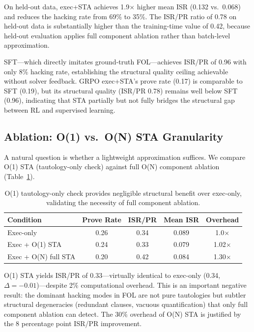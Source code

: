 \documentclass[11pt,a4paper]{article}
\begin{document}
On held-out data, exec+STA achieves 1.9$\times$ higher mean ISR (0.132 vs.\ 0.068) and reduces the hacking rate from 69\% to 35\%.
The ISR/PR ratio of 0.78 on held-out data is substantially higher than the training-time value of 0.42, because held-out evaluation applies full component ablation rather than batch-level approximation.

SFT---which directly imitates ground-truth FOL---achieves ISR/PR of 0.96 with only 8\% hacking rate, establishing the structural quality ceiling achievable without solver feedback.
GRPO exec+STA's prove rate (0.17) is comparable to SFT (0.19), but its structural quality (ISR/PR 0.78) remains well below SFT (0.96), indicating that STA partially but not fully bridges the structural gap between RL and supervised learning.

\subsection{Ablation: O(1) vs.\ O(N) STA Granularity}

A natural question is whether a lightweight approximation suffices.
We compare O(1) STA (tautology-only check) against full O(N) component ablation (Table~\ref{tab:o1_on}).

\begin{table}[t]
\centering
\small
\caption{O(1) tautology-only check provides negligible structural benefit over exec-only, validating the necessity of full component ablation.}
\label{tab:o1_on}
\begin{tabular}{lcccc}
\toprule
Condition & Prove Rate & ISR/PR & Mean ISR & Overhead \\
\midrule
Exec-only           & 0.26 & 0.34 & 0.089 & 1.0$\times$ \\
Exec + O(1) STA     & 0.24 & 0.33 & 0.079 & 1.02$\times$ \\
Exec + O(N) full STA & 0.20 & 0.42 & 0.084 & 1.30$\times$ \\
\bottomrule
\end{tabular}
\end{table}

O(1) STA yields ISR/PR of 0.33---virtually identical to exec-only (0.34, $\Delta = -0.01$)---despite 2\% computational overhead.
This is an important negative result: the dominant hacking modes in FOL are not pure tautologies but subtler structural degeneracies (redundant clauses, vacuous quantification) that only full component ablation can detect.
The 30\% overhead of O(N) STA is justified by the 8 percentage point ISR/PR improvement.
\end{document}
